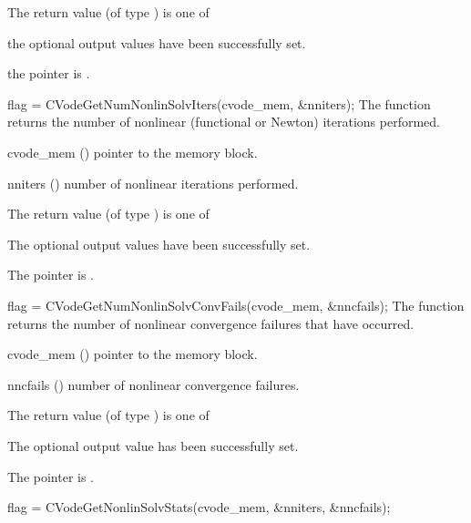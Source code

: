 {
  The return value  (of type ) is one of
  \begin{args}
  \item[\Id{CV\_SUCCESS}] 
    the optional output values have been successfully set.
  \item[\Id{CV\_MEM\_NULL}]
    the  pointer is .
  \end{args}
}
{}
{
  flag = CVodeGetNumNonlinSolvIters(cvode\_mem, \&nniters);
}
{
  The function  returns the
  number of nonlinear (functional or Newton) iterations performed. 
}
{
  \begin{args}
  \item[cvode\_mem] ()
    pointer to the {\cvodes} memory block.
  \item[nniters] ()
    number of nonlinear iterations performed.
  \end{args}
}
{
  The return value  (of type ) is one of
  \begin{args}
  \item[\Id{CV\_SUCCESS}] 
    The optional output values have been successfully set.
  \item[\Id{CV\_MEM\_NULL}]
    The  pointer is .
  \end{args}
}
{}
{
  flag = CVodeGetNumNonlinSolvConvFails(cvode\_mem, \&nncfails);
}
{
  The function  returns the
  number of nonlinear convergence failures that have occurred.
}
{
  \begin{args}
  \item[cvode\_mem] ()
    pointer to the {\cvodes} memory block.
  \item[nncfails] ()
    number of nonlinear convergence failures.
  \end{args}
}
{
  The return value  (of type ) is one of
  \begin{args}
  \item[\Id{CV\_SUCCESS}] 
    The optional output value has been successfully set.
  \item[\Id{CV\_MEM\_NULL}]
    The  pointer is .
  \end{args}
}
{}
{
  flag = CVodeGetNonlinSolvStats(cvode\_mem, \&nniters, \&nncfails);
}
